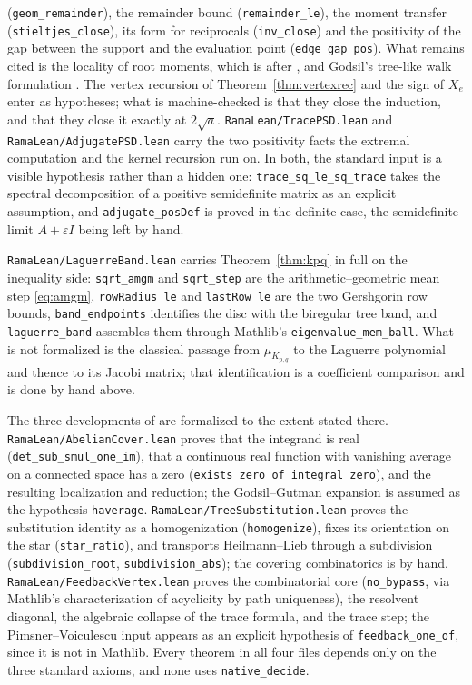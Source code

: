 \documentclass[11pt]{article}
\theoremstyle{remark}
\begin{document}
(\texttt{geom\_remainder}), the remainder bound (\texttt{remainder\_le}), the moment
transfer (\texttt{stieltjes\_close}), its form for reciprocals (\texttt{inv\_close}) and the
positivity of the gap between the support and the evaluation point
(\texttt{edge\_gap\_pos}). What remains cited is the locality of root moments, which is
\cite{CsF} after \cite{AH}, and Godsil's tree-like walk formulation \cite{Go}. The vertex recursion of Theorem~\ref{thm:vertexrec} and the
sign of $X_e$ enter as hypotheses; what is machine-checked is that they close the
induction, and that they close it exactly at $2\sqrt a$.
\texttt{RamaLean/TracePSD.lean} and
\texttt{RamaLean/AdjugatePSD.lean} carry the two positivity facts the extremal
computation and the kernel recursion run on. In both, the standard input is a
visible hypothesis rather than a hidden one: \texttt{trace\_sq\_le\_sq\_trace}
takes the spectral decomposition of a positive semidefinite matrix as an explicit
assumption, and \texttt{adjugate\_posDef} is proved in the definite case, the
semidefinite limit $A+\varepsilon I$ being left by hand.

\texttt{RamaLean/LaguerreBand.lean} carries Theorem~\ref{thm:kpq} in full on the
inequality side: \texttt{sqrt\_amgm} and \texttt{sqrt\_step} are the arithmetic--geometric
mean step \eqref{eq:amgm}, \texttt{rowRadius\_le} and \texttt{lastRow\_le} are the two
Gershgorin row bounds, \texttt{band\_endpoints} identifies the disc with the biregular
tree band, and \texttt{laguerre\_band} assembles them through Mathlib's
\texttt{eigenvalue\_mem\_ball}. What is not formalized is the classical passage from
$\mu_{K_{p,q}}$ to the Laguerre polynomial and thence to its Jacobi matrix; that
identification is a coefficient comparison and is done by hand above.

The three developments of \cite{PartI} are formalized to the extent stated
there. \texttt{RamaLean/AbelianCover.lean} proves that the integrand is real
(\texttt{det\_sub\_smul\_one\_im}), that a continuous real function with vanishing average
on a connected space has a zero (\texttt{exists\_zero\_of\_integral\_zero}), and the
resulting localization and reduction; the Godsil--Gutman expansion is assumed as the
hypothesis \texttt{haverage}. \texttt{RamaLean/TreeSubstitution.lean} proves the
substitution identity as a homogenization (\texttt{homogenize}), fixes its orientation on
the star (\texttt{star\_ratio}), and transports Heilmann--Lieb through a subdivision
(\texttt{subdivision\_root}, \texttt{subdivision\_abs}); the covering combinatorics is by
hand. \texttt{RamaLean/FeedbackVertex.lean} proves the combinatorial core
(\texttt{no\_bypass}, via Mathlib's characterization of acyclicity by path uniqueness), the
resolvent diagonal, the algebraic collapse of the trace formula, and the trace step; the
Pimsner--Voiculescu input appears as an explicit hypothesis of
\texttt{feedback\_one\_of}, since it is not in Mathlib. Every theorem in all four files
depends only on the three standard axioms, and none uses \texttt{native\_decide}.
\end{document}
